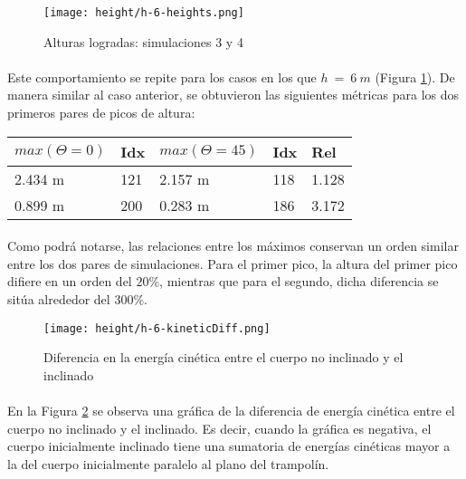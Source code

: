 \documentclass[12pt, twocolumn]{article}
\begin{document}
    \begin{figure}[H]
		\centering
		\texttt{[image: height/h-6-heights.png]}
		\caption{Alturas logradas: simulaciones 3 y 4}
		\label{h6}
	\end{figure}
	
	\paragraph{} Este comportamiento se repite para los casos en los que $h\:=\:6\:m$ (Figura \ref{h6}). De manera similar al caso anterior, se obtuvieron las siguientes métricas para los dos primeros pares de picos de altura:
	
	\begin{table}[H]
    \begin{tabular}{@{}lllll@{}}
    \toprule
    $max(\Theta = 0)$ & Idx & $max(\Theta = 45)$ & Idx & Rel    \\ \midrule
    2.434 m           & 121 & 2.157 m             & 118 & 1.128 \\
    0.899 m           & 200 & 0.283 m            & 186 & 3.172 \\ \bottomrule
    \end{tabular}
    \end{table}
	
	\paragraph{} Como podrá notarse, las relaciones entre los máximos conservan un orden similar entre los dos pares de simulaciones. Para el primer pico, la altura del primer pico difiere en un orden del $20\%$, mientras que para el segundo, dicha diferencia se sitúa alrededor del $300\%$.
	
    \begin{figure}[H]
		\centering
		\texttt{[image: height/h-6-kineticDiff.png]}
		\caption{Diferencia en la energía cinética entre el cuerpo no inclinado y el inclinado}
		\label{h6kineticdiff}
	\end{figure}
	
	\paragraph{} En la Figura \ref{h6kineticdiff} se observa una gráfica de la diferencia de energía cinética entre el cuerpo no inclinado y el inclinado. Es decir, cuando la gráfica es negativa, el cuerpo inicialmente inclinado tiene una sumatoria de energías cinéticas mayor a la del cuerpo inicialmente paralelo al plano del trampolín.
	
\end{document}
